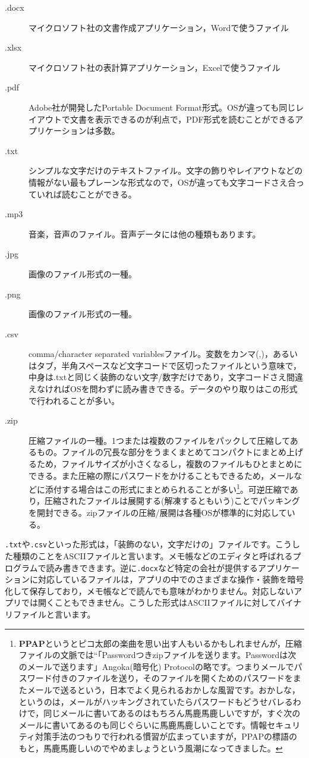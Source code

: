 \documentclass{ltjsbook}
\begin{document}
\begin{description}
	\item[.docx] マイクロソフト社の文書作成アプリケーション，Wordで使うファイル
	\item[.xlsx] マイクロソフト社の表計算アプリケーション，Excelで使うファイル
	\item[.pdf]  Adobe社が開発したPortable Document Format形式。OSが違っても同じレイアウトで文書を表示できるのが利点で，PDF形式を読むことができるアプリケーションは多数。
	\item[.txt] シンプルな文字だけのテキストファイル。文字の飾りやレイアウトなどの情報がない最もプレーンな形式なので，OSが違っても文字コードさえ合っていれば読むことができる。
	\item[.mp3] 音楽，音声のファイル。音声データには他の種類もあります。
	\item[.jpg] 画像のファイル形式の一種。
	\item[.png] 画像のファイル形式の一種。
	\item[.csv]  comma/character separated variablesファイル。変数をカンマ(,)，あるいはタブ，半角スペースなど文字コードで区切ったファイルという意味で，中身は.txtと同じく装飾のない文字/数字だけであり，文字コードさえ間違えなければOSを問わずに読み書きできる。データのやり取りはこの形式で行われることが多い。
	\item[.zip] 圧縮ファイルの一種。1つまたは複数のファイルをパックして圧縮してあるもの。ファイルの冗長な部分をうまくまとめてコンパクトにまとめ上げるため，ファイルサイズが小さくなるし，複数のファイルもひとまとめにできる。また圧縮の際にパスワードをかけることもできるため，メールなどに添付する場合はこの形式にまとめられることが多い\footnote{\textbf{PPAP}というとピコ太郎の楽曲を思い出す人もいるかもしれませんが，圧縮ファイルの文脈では``「Passwordつきzipファイルを送ります。Passwordは次のメールで送ります」Angoka(暗号化) Protocolの略です。つまりメールでパスワード付きのファイルを送り，そのファイルを開くためのパスワードをまたメールで送るという，日本でよく見られるおかしな風習です。おかしな，というのは，メールがハッキングされていたらパスワードもどうせバレるわけで，同じメールに書いてあるのはもちろん馬鹿馬鹿しいですが，すぐ次のメールに書いてあるのも同じぐらいに馬鹿馬鹿しいことです。情報セキュリティ対策手法のつもりで行われる慣習が広まっていますが，PPAPの標語のもと，馬鹿馬鹿しいのでやめましょうという風潮になってきました。}。可逆圧縮であり，圧縮されたファイルは展開する(解凍するともいう)ことでパッキングを開封できる。zipファイルの圧縮/展開は各種OSが標準的に対応している。
\end{description}
\texttt{.txt}や\texttt{.csv}といった形式は，「装飾のない，文字だけの」ファイルです。こうした種類のことをASCIIファイルと言います。メモ帳などのエディタと呼ばれるプログラムで読み書きできます。逆に\texttt{.docx}など特定の会社が提供するアプリケーションに対応しているファイルは，アプリの中でのさまざまな操作・装飾を暗号化して保存しており，メモ帳などで読んでも意味がわかりません。対応しないアプリでは開くこともできません。こうした形式はASCIIファイルに対してバイナリファイルと言います。
\end{document}
